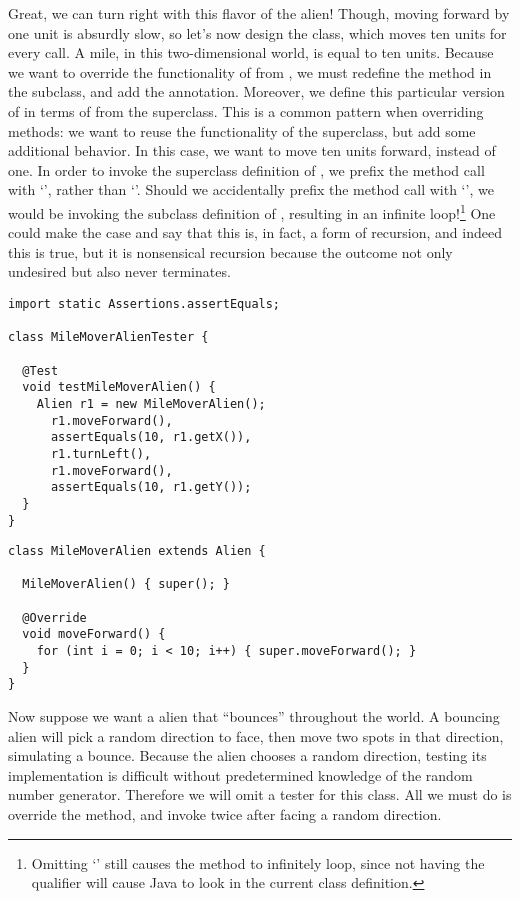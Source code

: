 Great, we can turn right with this flavor of the alien! Though, moving forward by one unit is absurdly slow, so let's now design the  class, which moves ten units for every  call. A mile, in this two-dimensional world, is equal to ten units. Because we want to override the functionality of  from , we must redefine the method in the subclass, and add the  annotation. Moreover, we define this particular version of  in terms of  from the superclass. This is a common pattern when overriding methods: we want to reuse the functionality of the superclass, but add some additional behavior. In this case, we want to move ten units forward, instead of one. In order to invoke the superclass definition of , we prefix the method call with `', rather than `'. Should we accidentally prefix the method call with `', we would be invoking the subclass definition of , resulting in an infinite loop!\footnote{Omitting `' still causes the method to infinitely loop, since not having the qualifier will cause Java to look in the current class definition.} One could make the case and say that this is, in fact, a form of recursion, and indeed this is true, but it is nonsensical recursion because the outcome not only undesired but also never terminates.


\begin{lstlisting}[language=MyJava]
import static Assertions.assertEquals;

class MileMoverAlienTester {

  @Test
  void testMileMoverAlien() {
    Alien r1 = new MileMoverAlien();
      r1.moveForward(),
      assertEquals(10, r1.getX()),
      r1.turnLeft(),
      r1.moveForward(),
      assertEquals(10, r1.getY());
  }
}
\end{lstlisting}

\begin{lstlisting}[language=MyJava]
class MileMoverAlien extends Alien {

  MileMoverAlien() { super(); }

  @Override
  void moveForward() {
    for (int i = 0; i < 10; i++) { super.moveForward(); }
  }
}
\end{lstlisting}

Now suppose we want a alien that ``bounces'' throughout the world. A bouncing alien will pick a random direction to face, then move two spots in that direction, simulating a bounce. Because the alien chooses a random direction, testing its implementation is difficult without predetermined knowledge of the random number generator. Therefore we will omit a tester for this class. All we must do is override the  method, and invoke  twice after facing a random direction.


